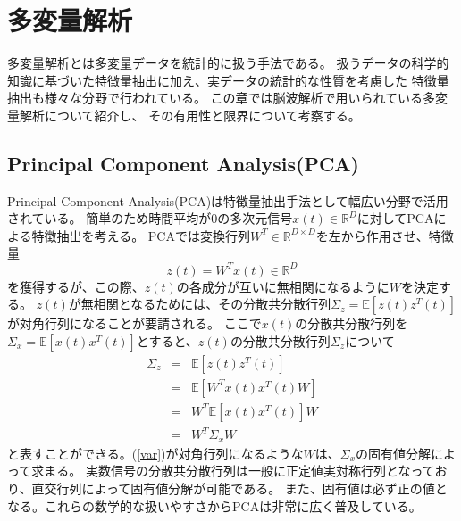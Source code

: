 \section{多変量解析}
多変量解析とは多変量データを統計的に扱う手法である。
扱うデータの科学的知識に基づいた特徴量抽出に加え、実データの統計的な性質を考慮した
特徴量抽出も様々な分野で行われている。
この章では脳波解析で用いられている多変量解析について紹介し、
その有用性と限界について考察する。

\subsection{Principal Component Analysis(PCA)}
Principal Component Analysis(PCA)は特徴量抽出手法として幅広い分野で活用されている。
簡単のため時間平均が\(0\)の多次元信号\(x(t)\in \mathbb R^D\)に対してPCAによる特徴抽出を考える。
PCAでは変換行列\(W^T \in \mathbb R^{D \times D}\)を左から作用させ、特徴量
\begin{equation}
    z(t)=W^Tx(t) \in \mathbb R^D
\end{equation}
を獲得するが、この際、\(z(t)\)の各成分が互いに無相関になるように\(W\)を決定する。
\(z(t)\)が無相関となるためには、その分散共分散行列\(\Sigma_z=\mathbb E[z(t)z^T(t)]\)が対角行列になることが要請される。
ここで\(x(t)\)の分散共分散行列を\(\Sigma_x=\mathbb E[x(t)x^T(t)]\)とすると、\(z(t)\)の分散共分散行列\(\Sigma_z\)について
\begin{eqnarray}
    \Sigma_z & = & \mathbb E[z(t)z^T(t)] \nonumber \\
    & = & \mathbb E[W^Tx(t)x^T(t)W] \nonumber \\
    & = & W^T \mathbb E[x(t)x^T(t)]W \nonumber \\
    & = & W^T \Sigma_x W
    \label{var}
\end{eqnarray}
と表すことができる。(\ref{var})が対角行列になるような\(W\)は、\(\Sigma_x\)の固有値分解によって求まる。
実数信号の分散共分散行列は一般に正定値実対称行列となっており、直交行列によって固有値分解が可能である。
また、固有値は必ず正の値となる。これらの数学的な扱いやすさからPCAは非常に広く普及している。
